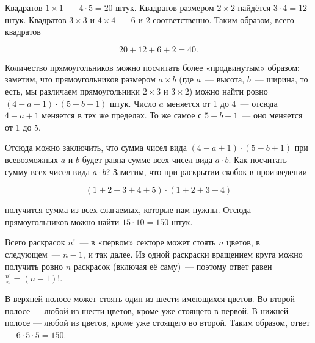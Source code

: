\begin{itemize}
\itA Квадратов $1 \times 1$~— $4 \cdot 5 = 20$ штук. Квадратов размером $2 \times 2$ найдётся $3 \cdot 4 = 12$ штук. Квадратов $3 \times 3$ и $4 \times 4$~— 6 и 2 соответственно. Таким образом, всего квадратов

$$20 + 12 + 6 + 2 = 40.$$

Количество прямоугольников можно посчитать более «продвинутым» образом: заметим, что прямоугольников размером $a \times b$ (где $a$~— высота, $b$~— ширина, то есть, мы различаем прямоугольники $2 \times 3$ и $3 \times 2$) можно найти ровно $(4-a+1) \cdot (5-b+1)$ штук. Число $a$ меняется от 1 до 4~— отсюда $4-a+1$ меняется в тех же пределах. То же самое с $5-b+1$~— оно меняется от 1 до 5.

\ms Отсюда можно заключить, что сумма чисел вида $(4-a+1) \cdot (5-b+1)$ при всевозможных $a$ и $b$ будет равна сумме всех чисел вида $a \cdot b$. Как посчитать сумму всех чисел вида $a \cdot b$? Заметим, что при раскрытии скобок в произведении

$$(1+2+3+4+5) \cdot (1+2+3+4)$$

получится сумма из всех слагаемых, которые нам нужны. Отсюда прямоугольников можно найти $15 \cdot 10 = 150$ штук.

\itB \label{mgap-ba} Всего раскрасок $n!$~— в «первом» секторе может стоять $n$ цветов, в следующем~— $n-1$, и так далее. Из одной раскраски вращением круга можно получить ровно $n$ раскрасок (включая её саму)~— поэтому ответ равен $\tfrac{n!}{n} = (n-1)!$.

\itC В верхней полосе может стоять один из шести имеющихся цветов. Во второй полосе — любой из шести цветов, кроме уже стоящего в первой. В нижней полосе — любой из цветов, кроме уже стоящего во второй. Таким образом, ответ — $6 \cdot 5 \cdot 5 = 150$.
\end{itemize}